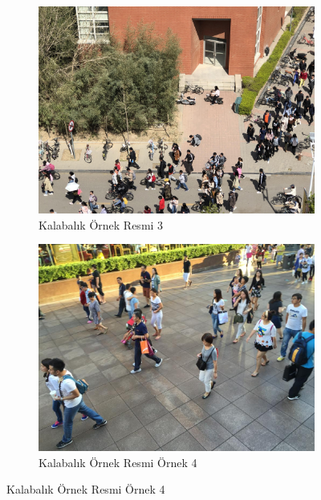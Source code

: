 \documentclass[10pt,a4paper]{report}
\begin{document}
	
	
	\begin{figure}[!h]
		\begin{subfigure}{\textwidth}
			\raggedright
			\includegraphics[width=\textwidth]{NPWU1}
			\caption{Kalabalık Örnek Resmi 3 \cite{wang2020nwpu}}
			\label{Ornek3}
		\end{subfigure}
		\begin{subfigure}{\textwidth}
			\raggedright
			\includegraphics[width=\textwidth]{ornek4.jpg}
			\caption{Kalabalık Örnek Resmi Örnek 4 \cite{shanghaitechdataset}}
			\label{Ornek4}
		\end{subfigure}
	\end{figure}
	
\end{document}
